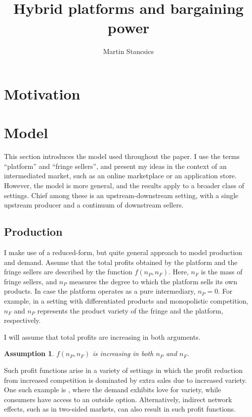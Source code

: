 \documentclass[a4paper]{article}
\title{Hybrid platforms and bargaining power}
\author{Martin Stancsics}
\newtheorem{assumption}{Assumption}
\begin{document}
\maketitle

\begin{abstract}
\end{abstract}


\section{Motivation}


\section{Model}

This section introduces the model used throughout the paper.
I use the terms ``platform'' and ``fringe sellers'', and present my ideas in the context of an intermediated market, such as an online marketplace or an application store.
However, the model is more general, and the results apply to a broader class of settings.
Chief among these is an upstream-downstream setting, with a single upstream producer and a continuum of downstream sellers.

\subsection{Production}

I make use of a reduced-form, but quite general approach to model production and demand.
Assume that the total profits obtained by the platform and the fringe sellers are described by the function $f(n_P, n_F)$.
Here, $n_F$ is the mass of fringe sellers, and $n_P$ measures the degree to which the platform sells its own products.
In case the platform operates as a pure intermediary, $n_P = 0$.
For example, in a setting with differentiated products and monopolistic competition, $n_F$ and $n_P$ represents the product variety of the fringe and the platform, respectively.

I will assume that total profits are increasing in both arguments.
\begin{assumption}
    \label{ass:monotone_profits}
    $f(n_P, n_F)$ is increasing in both $n_P$ and $n_F$.
\end{assumption}
Such profit functions arise in a variety of settings in which the profit reduction from increased competition is dominated by extra sales due to increased variety.
One such example is \textcite{anderson2020aggregative}, where the demand exhibits love for variety, while consumers have access to an outside option.
Alternatively, indirect network effects, such as in two-sided markets, can also result in such profit functions.
\end{document}
